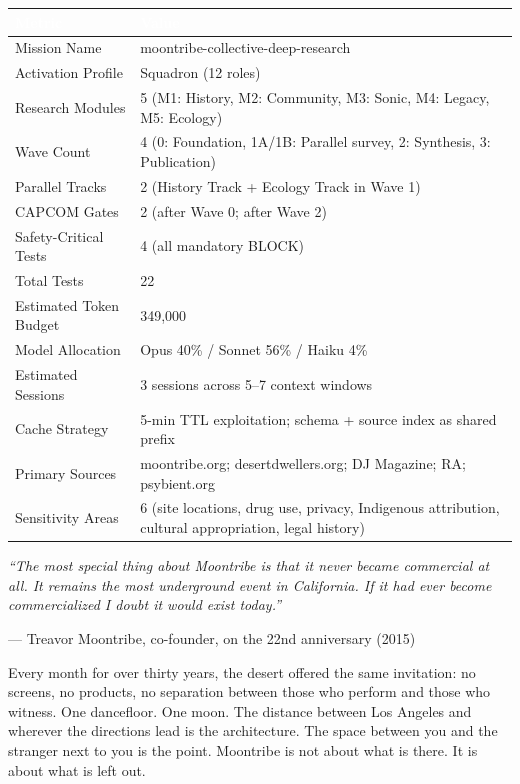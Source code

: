 \documentclass[11pt,letterpaper]{article}
\newcommand{\tableheader}[1]{\textbf{\sffamily\textcolor{white}{#1}}}
\begin{document}
\begin{center}
\begin{tabularx}{\textwidth}{L{4cm}X}
\toprule
{}
\tableheader{Metric} & \tableheader{Value} \\
\midrule
Mission Name & moontribe-collective-deep-research \\
Activation Profile & Squadron (12 roles) \\
Research Modules & 5 (M1: History, M2: Community, M3: Sonic, M4: Legacy, M5: Ecology) \\
Wave Count & 4 (0: Foundation, 1A/1B: Parallel survey, 2: Synthesis, 3: Publication) \\
Parallel Tracks & 2 (History Track + Ecology Track in Wave 1) \\
CAPCOM Gates & 2 (after Wave 0; after Wave 2) \\
Safety-Critical Tests & 4 (all mandatory BLOCK) \\
Total Tests & 22 \\
Estimated Token Budget & 349,000 \\
Model Allocation & Opus 40\% / Sonnet 56\% / Haiku 4\% \\
Estimated Sessions & 3 sessions across 5--7 context windows \\
Cache Strategy & 5-min TTL exploitation; schema + source index as shared prefix \\
Primary Sources & moontribe.org; desertdwellers.org; DJ Magazine; RA; psybient.org \\
Sensitivity Areas & 6 (site locations, drug use, privacy, Indigenous attribution, cultural appropriation, legal history) \\
\bottomrule
\end{tabularx}
\end{center}

\vspace{2em}

\begin{quotebox}
{\large\sffamily\itshape\textcolor{primary}
{``The most special thing about Moontribe is that it never became commercial at all. It remains the most underground event in California. If it had ever become commercialized I doubt it would exist today.''}}

\vspace{0.5em}
{\small\sffamily\textcolor{secondary}{--- Treavor Moontribe, co-founder, on the 22nd anniversary (2015)}}

\vspace{1em}
{\normalsize\sffamily\textcolor{darktext}
{Every month for over thirty years, the desert offered the same invitation: no screens, no products, no separation between those who perform and those who witness. One dancefloor. One moon. The distance between Los Angeles and wherever the directions lead is the architecture. The space between you and the stranger next to you is the point. Moontribe is not about what is there. It is about what is left out.}}
\end{quotebox}
\end{document}
